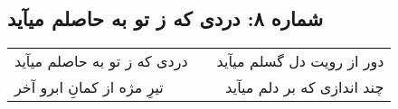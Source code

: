 \begin{center}
\section*{شماره ۸: دردی که ز تو به حاصلم میآید}
\label{sec:008}
\begin{longtable}{l p{0.5cm} r}
دردی که ز تو به حاصلم میآید
&&
دور از رویت دل گسلم میآید
\\
تیرِ مژه از کمانِ ابرو آخر
&&
چند اندازی که بر دلم میآید
\\
\end{longtable}
\end{center}
